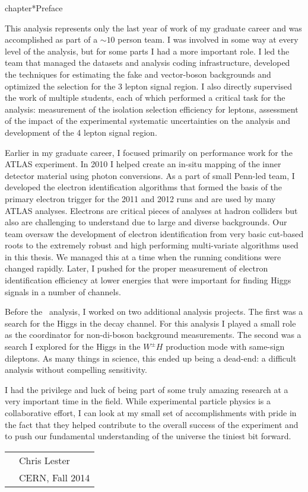 chapter*{Preface}

This analysis represents only the last year of work of my graduate career and was accomplished as part of
a $\sim10$ person team. I was involved in some way at every level 
of the analysis, but for some parts I had a more important role.
I led the team that managed the datasets and analysis coding infrastructure, developed the techniques
for estimating the fake and vector-boson backgrounds and optimized
the selection for the 3 lepton signal region. I also directly supervised the work of multiple students, 
each of which performed a critical task for the analysis: measurement of the isolation
selection efficiency for leptons, assessment of the impact of the experimental
systematic uncertainties on the analysis and development of the 4 lepton signal region. 

Earlier in my graduate career, I focused primarily on performance work for the ATLAS experiment.
In 2010 I helped create an in-situ mapping of the inner detector material using photon conversions.  
As a part of small Penn-led team, I developed the electron
identification algorithms that formed the basis of the primary electron trigger for the
2011 and 2012 runs and are used by many ATLAS analyses. Electrons are critical 
pieces of analyses at hadron colliders but also are challenging to understand
due to large and diverse backgrounds. Our team oversaw the development of electron identification
from very basic cut-based roots to the extremely robust and high performing
multi-variate algorithms used in this thesis. We managed this at a time
when the running conditions were changed rapidly. Later, I pushed for the proper
measurement of electron identification efficiency at lower energies that 
were important for finding Higgs signals in a number of channels.

Before the \tth\ analysis, I worked on two additional analysis projects. The first
was a search for the Higgs in the \WW decay channel. For this analysis
I played a small role as the coordinator for non-\WW di-boson background measurements.
The second was a search I explored for the Higgs in the $W^{\pm}H$ production
mode with same-sign dileptons. As many things in science, this ended up
being a dead-end: a difficult analysis without compelling sensitivity. 

I had the privilege and luck of being part of some truly amazing research at a very important
time in the field. While experimental particle physics is a collaborative effort,
I can look at my small set of accomplishments with pride in the fact that they helped 
contribute to the overall success of the experiment and to push our fundamental 
understanding of the universe the tiniest bit forward. 


\vspace{0.05\textheight}

\begin{tabular}{p{} l}
  & Chris Lester            \\
  & CERN, Fall 2014   \\
\end{tabular}

